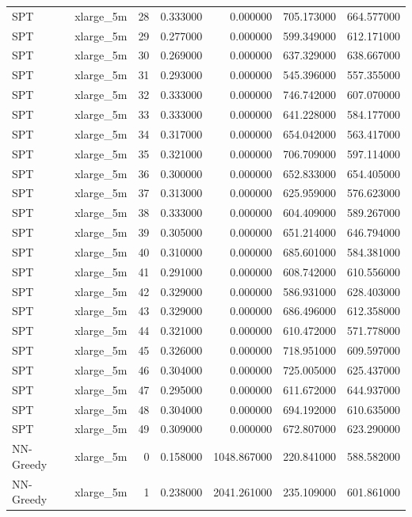 \begin{tabular}{llrrrrr}
SPT & xlarge_5m & 28 & 0.333000 & 0.000000 & 705.173000 & 664.577000 \\
SPT & xlarge_5m & 29 & 0.277000 & 0.000000 & 599.349000 & 612.171000 \\
SPT & xlarge_5m & 30 & 0.269000 & 0.000000 & 637.329000 & 638.667000 \\
SPT & xlarge_5m & 31 & 0.293000 & 0.000000 & 545.396000 & 557.355000 \\
SPT & xlarge_5m & 32 & 0.333000 & 0.000000 & 746.742000 & 607.070000 \\
SPT & xlarge_5m & 33 & 0.333000 & 0.000000 & 641.228000 & 584.177000 \\
SPT & xlarge_5m & 34 & 0.317000 & 0.000000 & 654.042000 & 563.417000 \\
SPT & xlarge_5m & 35 & 0.321000 & 0.000000 & 706.709000 & 597.114000 \\
SPT & xlarge_5m & 36 & 0.300000 & 0.000000 & 652.833000 & 654.405000 \\
SPT & xlarge_5m & 37 & 0.313000 & 0.000000 & 625.959000 & 576.623000 \\
SPT & xlarge_5m & 38 & 0.333000 & 0.000000 & 604.409000 & 589.267000 \\
SPT & xlarge_5m & 39 & 0.305000 & 0.000000 & 651.214000 & 646.794000 \\
SPT & xlarge_5m & 40 & 0.310000 & 0.000000 & 685.601000 & 584.381000 \\
SPT & xlarge_5m & 41 & 0.291000 & 0.000000 & 608.742000 & 610.556000 \\
SPT & xlarge_5m & 42 & 0.329000 & 0.000000 & 586.931000 & 628.403000 \\
SPT & xlarge_5m & 43 & 0.329000 & 0.000000 & 686.496000 & 612.358000 \\
SPT & xlarge_5m & 44 & 0.321000 & 0.000000 & 610.472000 & 571.778000 \\
SPT & xlarge_5m & 45 & 0.326000 & 0.000000 & 718.951000 & 609.597000 \\
SPT & xlarge_5m & 46 & 0.304000 & 0.000000 & 725.005000 & 625.437000 \\
SPT & xlarge_5m & 47 & 0.295000 & 0.000000 & 611.672000 & 644.937000 \\
SPT & xlarge_5m & 48 & 0.304000 & 0.000000 & 694.192000 & 610.635000 \\
SPT & xlarge_5m & 49 & 0.309000 & 0.000000 & 672.807000 & 623.290000 \\
NN-Greedy & xlarge_5m & 0 & 0.158000 & 1048.867000 & 220.841000 & 588.582000 \\
NN-Greedy & xlarge_5m & 1 & 0.238000 & 2041.261000 & 235.109000 & 601.861000 \\

\end{tabular}
